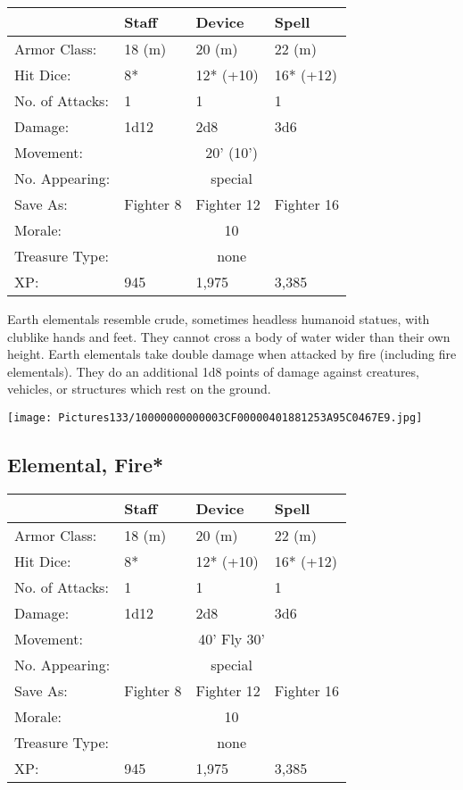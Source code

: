 \documentclass[a4paper,twoside,openany,10pt]{book}
\begin{document}
\begin{multicols}{2}
\begin{tabularx}{0.48\textwidth}{@{}lXXX@{}}
& Staff & Device & Spell \\\hline
Armor Class: & 18 (m) & 20 (m) & 22 (m) \\\hline
Hit Dice: & 8* & 12* (+10) & 16* (+12) \\\hline
No. of Attacks: & 1 & 1 & 1 \\\hline
Damage: & 1d12 & 2d8 & 3d6 \\\hline
Movement: & \multicolumn{3}{c}{20' (10')} \\\hline
No. Appearing: &\multicolumn{3}{c}{special} \\\hline
Save As: & Fighter 8 & Fighter 12 & Fighter 16 \\\hline
Morale: & \multicolumn{3}{c}{10} \\\hline
Treasure Type: & \multicolumn{3}{c}{none} \\\hline
XP: & 945 & 1,975 & 3,385 \\\hline
\end{tabularx}\medskip

Earth elementals resemble crude, sometimes headless humanoid statues, with clublike hands and feet. They cannot cross a body of water wider than their own height. Earth elementals take double damage when attacked by fire (including fire elementals). They do an additional 1d8 points of damage against creatures, vehicles, or structures which rest on the ground.

\begin{center}
	\texttt{[image: Pictures133/10000000000003CF00000401881253A95C0467E9.jpg]}
\end{center}

\columnbreak


\subsection*{Elemental, Fire*}\label{elemental-fire}
\begin{tabularx}{0.48\textwidth}{@{}lllX@{}}
& Staff & Device & Spell \\\hline
Armor Class: & 18 (m) & 20 (m) & 22 (m) \\\hline
Hit Dice: & 8* & 12* (+10) & 16* (+12) \\\hline
No. of Attacks: & 1 & 1 & 1 \\\hline
Damage: & 1d12 & 2d8 & 3d6 \\\hline
Movement:  & \multicolumn{3}{c}{40' Fly 30'}\\\hline
No. Appearing: &\multicolumn{3}{c}{special} \\\hline
Save As: & Fighter 8 & Fighter 12 & Fighter 16 \\\hline
Morale: & \multicolumn{3}{c}{10} \\\hline
Treasure Type: & \multicolumn{3}{c}{none} \\\hline
XP: & 945 & 1,975 & 3,385 \\\hline
\end{tabularx}\medskip


\end{multicols}
\end{document}
